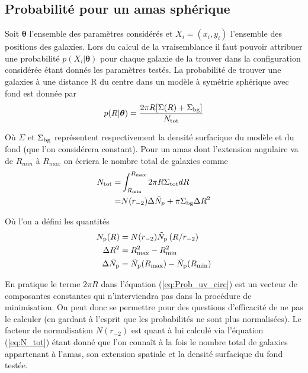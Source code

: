 \documentclass[a4paper,11pt]{article}
\numberwithin{equation}{section}
\begin{document}
    \subsection{Probabilité pour un amas sphérique}
    Soit $\bm{\theta}$ l'ensemble des paramètres considérés et $ X_i = (x_i , y_i)$ l'ensemble des positions des galaxies. Lors du calcul de la vraisemblance il faut pouvoir attribuer une probabilité $p(X_i | \bm{\theta})$ pour chaque galaxie de la trouver dans la configuration considérée étant donnés les paramètres testés.
La probabilité de trouver une galaxies à une distance R du centre dans un modèle à symétrie sphérique avec fond est donnée par\cite{Mamon2010}  %
    \begin{equation}
      \label{eq:Prob_uv_circ}
      p(R | \bm{\theta}) =  \frac{2\pi R [ \Sigma (R) + \Sigma_{\rm{bg}} ]}{N_{\rm{tot}}}
    \end{equation}
    
    Où $\Sigma$ et $\Sigma_{\rm{bg}}$ représentent respectivement la densité surfacique du modèle et du fond (que l'on considérera constant). Pour un amas dont l'extension angulaire va de $R_{min}$ à $R_{max}$ on écriera le nombre total de galaxies comme
    \begin{equation}
      \begin{split}   %
        \label{eq:N_tot}
        N_{\rm{tot}} =  & \int_{R_{\rm{min}}}^{R_{\rm{max}}} 2 \pi R \Sigma_{\rm{tot}} dR \\
                =  & N(r_{-2}) \Delta \tilde{N}_p + \pi \Sigma_{\rm{bg}} \Delta R^2
      \end{split}
    \end{equation}
    
    Où l'on a défini les quantités
      \begin{align*}
        N_{\rm{p}} (R) & = N(r_{-2}) \tilde{N}_{\rm{p}} \left ( R / r_{-2} \right ) \\
        \Delta R^2 & = R_{\rm{max}}^2 - R_{\rm{min}}^2 \\
        \Delta \tilde{N}_{\rm{p}} & = \tilde{N}_{\rm{p}} (R_{\rm{max}}) - \tilde{N}_{\rm{p}} (R_{\rm{min}})
      \end{align*}
      
  En pratique le terme $2\pi R$ dans l'équation (\ref{eq:Prob_uv_circ}) est un vecteur de composantes constantes qui n'interviendra pas dans la procédure de minimisation. On peut donc se permettre pour des questions d'efficacité de ne pas le calculer (en gardant à l'esprit que les probabilités ne sont plus normalisées).\newline
  Le facteur de normalisation $N(r_{-2})$ est quant à lui calculé via l'équation (\ref{eq:N_tot}) étant donné que l'on connaît à la fois le nombre total de galaxies appartenant à l'amas, son extension spatiale et la densité surfacique du fond testée.
\end{document}
